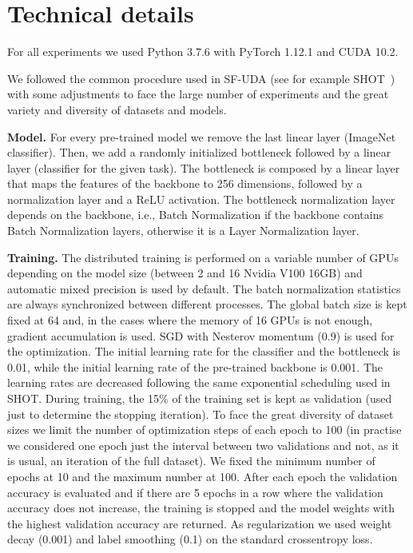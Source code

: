 \documentclass{article}
\begin{document}
\section{Technical details}
\label{techdet}

For all experiments we used Python 3.7.6 with PyTorch 1.12.1 and CUDA 10.2.

We followed the common procedure used in SF-UDA (see for example SHOT~\cite{liang2020we}) with some adjustments to face the large number of experiments and the great variety and diversity of datasets and models.

\textbf{Model.} For every pre-trained model we remove the last linear layer (ImageNet classifier). Then, we add a randomly initialized bottleneck followed by a linear layer (classifier for the given task).
The bottleneck is composed by a linear layer that maps the features of the backbone to 256 dimensions, followed by a normalization layer and a ReLU activation. The bottleneck normalization layer depends on the backbone, i.e., Batch Normalization if the backbone contains Batch Normalization layers, otherwise it is a Layer Normalization layer.

\textbf{Training.} The distributed training is performed on a variable number of GPUs depending on the model size (between 2 and 16 Nvidia V100 16GB) and automatic mixed precision is used by default.
The batch normalization statistics are always synchronized between different processes.
The global batch size is kept fixed at 64 and, in the cases where the memory of 16 GPUs is not enough, gradient accumulation is used. SGD with Nesterov momentum (0.9) is used for the optimization. The initial learning rate for the classifier and the bottleneck is 0.01, while the initial learning rate of the pre-trained backbone is 0.001. The learning rates are decreased following the same exponential scheduling used in SHOT.
During training, the 15\% of the training set is kept as validation (used just to determine the stopping iteration). To face the great diversity of dataset sizes we limit the number of optimization steps of each epoch to 100 (in practise we considered one epoch just the interval between two validations and not, as it is usual, an iteration of the full dataset). 
We fixed the minimum number of epochs at 10 and the maximum number at 100. After each epoch the validation accuracy is evaluated and if there are 5 epochs in a row where the validation accuracy does not increase, the training is stopped and the model weights with the highest validation accuracy are returned.
As regularization we used weight decay (0.001) and label smoothing (0.1) on the standard crossentropy loss.
\end{document}
